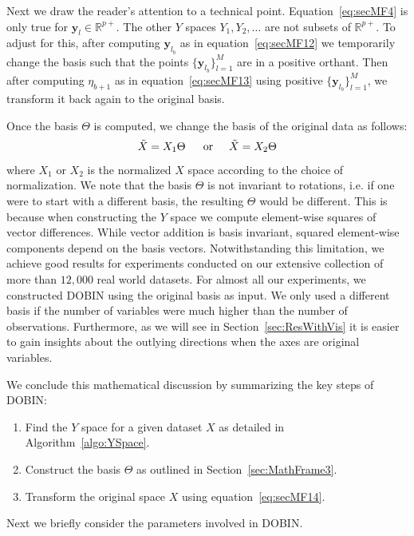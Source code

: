 \documentclass[a4paper,11pt]{article}
\begin{document}
Next we draw the reader's attention to a technical point. Equation~\eqref{eq:secMF4} is only true for  $\bm{y}_l \in \mathbb{R}^{p+}$. The other $Y$ spaces $Y_1, Y_2, \ldots $ are not  subsets of $\mathbb{R}^{p+}$. To adjust for this, after computing  $\bm{y}_{l_{b}}$ as in equation~\eqref{eq:secMF12} we temporarily change the basis such that the points  $\{ \bm{y}_{l_{b}}\}_{l=1}^M$ are in a positive orthant.  Then after computing  $\eta_{b+1}$ as in equation~\eqref{eq:secMF13} using positive $\{ \bm{y}_{l_{b}}\}_{l=1}^M$,  we transform it back again to the original basis.

Once the basis $\Theta$  is computed, we  change the basis of the original data as follows:
\begin{equation}\label{eq:secMF14}
    \tilde{X} = X_1 \Theta \,  \hspace{0.5cm}  \text{or}  \hspace{0.5cm}   \tilde{X} = X_2 \Theta
\end{equation}
where $X_1$ or $X_2$ is the normalized $X$ space according to the choice of normalization. We note that the basis $\Theta$ is not invariant to rotations, i.e. if one were to start with a different basis, the resulting $\Theta$ would be different. This is because when constructing the $Y$ space we compute element-wise squares of vector differences. While vector addition is basis invariant, squared element-wise components depend on the basis vectors. Notwithstanding this limitation, we achieve good results for experiments conducted on our extensive collection of more than $12,000$ real world datasets. For almost all our experiments, we constructed DOBIN using the original basis as input. We only used a different basis if the number of variables  were much higher than the number of observations.  %
Furthermore, as we will see in Section~\ref{sec:ResWithVis} it is easier to gain insights about the outlying directions when the axes are original variables.

We conclude this mathematical discussion by summarizing the key steps of DOBIN:
\begin{enumerate}
    \item Find the $Y$ space for a given dataset $X$ as detailed in Algorithm~\ref{algo:YSpace}.
    \item Construct the basis $\Theta$ as outlined in Section~\ref{sec:MathFrame3}.
    \item Transform the original space $X$ using equation~\eqref{eq:secMF14}.
\end{enumerate}
Next we briefly consider the parameters involved in DOBIN.
\end{document}
